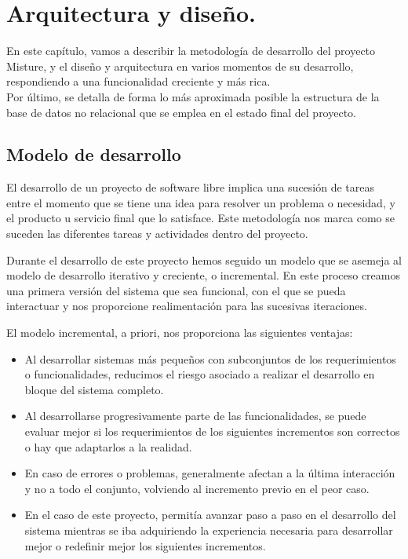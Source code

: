 \cleardoublepage
\chapter{Arquitectura y diseño.}
\label{chap:design_implement}

En este capítulo, vamos a describir la metodología de desarrollo del proyecto Misture, y el diseño y arquitectura en varios momentos de su desarrollo, respondiendo a una funcionalidad creciente y más rica.\\


Por último, se detalla de forma lo más aproximada posible la estructura de la base de datos no relacional que se emplea en el estado final del proyecto.\\


\section{Modelo de desarrollo} 
\label{subsec:modelo_desarrollo}

El desarrollo de un proyecto de software libre implica una sucesión de tareas entre el momento que se tiene una idea para resolver un problema o necesidad, y el producto u servicio final que lo satisface. Este metodología nos marca como se suceden las diferentes tareas y actividades dentro del proyecto.


Durante el desarrollo de este proyecto hemos seguido un modelo que se asemeja al modelo de desarrollo iterativo y creciente, o incremental. En este proceso creamos una primera versión del sistema que sea funcional, con el que se pueda interactuar y nos proporcione realimentación para las sucesivas iteraciones. \newpage	%




El modelo incremental, a priori, nos proporciona las siguientes ventajas:

\begin{itemize}
\item Al desarrollar sistemas más pequeños con subconjuntos de los requerimientos o funcionalidades, reducimos el riesgo asociado a realizar el desarrollo en bloque del sistema completo.

\item Al desarrollarse progresivamente parte de las funcionalidades, se puede evaluar mejor si los requerimientos de los siguientes incrementos son correctos o hay que adaptarlos a la realidad.

\item En caso de errores o problemas, generalmente afectan a la última interacción y no a todo el conjunto, volviendo al incremento previo en el peor caso.

\item En el caso de este proyecto, permitía avanzar paso a paso en el desarrollo del sistema mientras se iba adquiriendo la experiencia necesaria para desarrollar mejor o redefinir mejor los siguientes incrementos.
\end{itemize}


